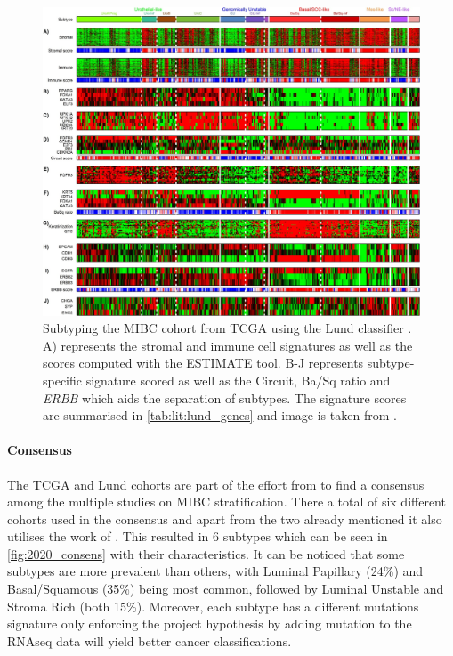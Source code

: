 \begin{figure}[!htb]   
\centering
\includegraphics[width=1.0\textwidth,height=1.0\textheight,keepaspectratio]{Sections/Lit_review/Resources/Lung_subtypes.jpg}
  \caption{Subtyping the MIBC cohort from TCGA using the Lund classifier \cite{Marzouka2018-ge}. A) represents the stromal and immune cell signatures as well as the scores computed with the ESTIMATE tool\cite{Yoshihara2013-wq}. B-J represents subtype-specific signature scored as well as the Circuit, Ba/Sq ratio and \textit{ERBB} which aids the separation of subtypes. The signature scores are summarised in \cref{tab:lit:lund_genes} and image is taken from \cite{Marzouka2018-ge}.
}
\label{fig:lit:lund_fig}
\end{figure}
\FloatBarrier


\paragraph*{Consensus} \label{s:lit:consensus_mibc}

The TCGA and Lund cohorts are part of the effort from \citet{Kamoun2020-tj} to find a consensus among the multiple studies on MIBC stratification. There a total of six different cohorts used in the consensus and apart from the two already mentioned \citet{Kamoun2020-tj} it also utilises the work of \citet{Mo2018-rl, Damrauer2014-tc, Choi2014-ed, Rebouissou2014-ep}. This resulted in 6 subtypes which can be seen in \cref{fig:2020_consens} with their characteristics. It can be noticed that some subtypes are more prevalent than others, with Luminal Papillary (24\%) and Basal/Squamous (35\%) being most common, followed by Luminal Unstable and Stroma Rich (both 15\%). Moreover, each subtype has a different mutations signature only enforcing the project hypothesis by adding mutation to the RNAseq data will yield better cancer classifications.

